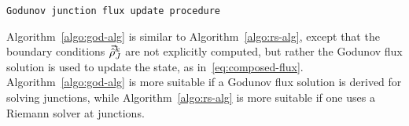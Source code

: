 \begin{algorithm}[h]
\caption{\texttt{Godunov junction flux update procedure}}



\end{algorithm}


Algorithm~\ref{algo:god-alg} is similar to Algorithm~\ref{algo:rs-alg},
except that the boundary conditions $\vec{\hat{\rho}}_{J}^{k}$ are
not explicitly computed, but rather the Godunov flux solution is used
to update the state, as in~\ref{eq:composed-flux}. Algorithm~\ref{algo:god-alg}
is more suitable if a Godunov flux solution is derived for solving
junctions, while Algorithm~\ref{algo:rs-alg} is more suitable if
one uses a Riemann solver at junctions.
